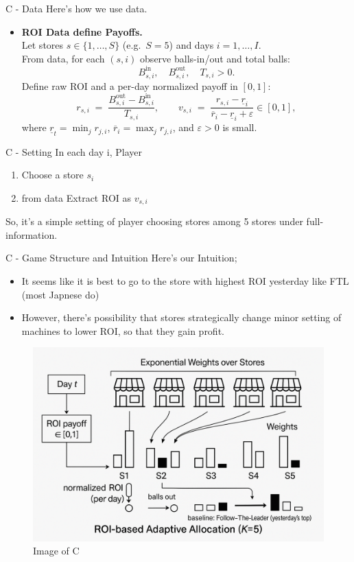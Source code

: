 \documentclass{beamer}
\begin{document}
\begin{frame}{C - Data}
    Here's how we use data.\\
    \begin{itemize}
        \item \textbf{ROI Data define Payoffs.}\\
    Let stores $s\in\{1,\dots,S\}$ (e.g.\ $S=5$) and days $i=1,\dots,I$.\\
    From data, for each $(s,i)$ observe balls-in/out and total balls:
    \[
    B^{\text{in}}_{s,i},\quad B^{\text{out}}_{s,i},\quad T_{s,i}>0.
    \]
    Define raw ROI and a per-day normalized payoff in $[0,1]$:
    \[
    r_{s,i}\;=\;\frac{B^{\text{out}}_{s,i}-B^{\text{in}}_{s,i}}{ T_{s,i}},\qquad
    v_{s,i}\;=\;\frac{r_{s,i}-\underline r_i}{\overline r_i-\underline r_i+\varepsilon}\in[0,1],
    \]
    where $\underline r_t=\min_{j} r_{j,i}$, $\overline r_i=\max_{j} r_{j,i}$, and $\varepsilon>0$ is small.
    \end{itemize}
\end{frame}

\begin{frame}{C - Setting}
In each day i, Player
\begin{enumerate}
  \item Choose a store $s_i$ 
  \item from data Extract ROI as $v_{s,i}$
\end{enumerate}
\vspace{1em}
So, it's a simple setting of player choosing stores among 5 stores under full-information.

\end{frame}

\begin{frame}{C - Game Structure and Intuition}
Here's our Intuition;
\begin{itemize}
    \item It seems like it is best to go to the store with highest ROI yesterday like FTL (most Japnese do)
    \item However, there's possibility that stores strategically change minor setting of machines to lower ROI, so that they gain profit. 
\end{itemize}
\begin{figure}
    \centering
    \includegraphics[width=0.4\linewidth]{332Project2/figures/Image_C.png}
    \caption{Image of C}
    \label{fig:placeholder}
\end{figure}

\end{frame}
\end{document}
